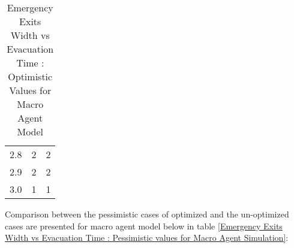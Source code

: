 \begin{table}[H]
{\begin{tabular}{|l|l|l|}
2.8                      & 2                                                                                                                   & 2                                                                                                                  \\
2.9                      & 2                                                                                                                   & 2                                                                                                                  \\
3.0                      & 1                                                                                                                   & 1                                                                                                                  \\
\hline
\end{tabular}}
\caption{Emergency Exits Width vs Evacuation Time : Optimistic Values for Macro Agent Model}
\label{Emergency Exits Width vs Evacuation Time : Optimistic Values for Macro Agent Model}
\end{table}

Comparison between the pessimistic cases of optimized and the un-optimized cases are presented for macro agent model below in table \ref{Emergency Exits Width vs Evacuation Time : Pessimistic values for Macro Agent Simulation}:


